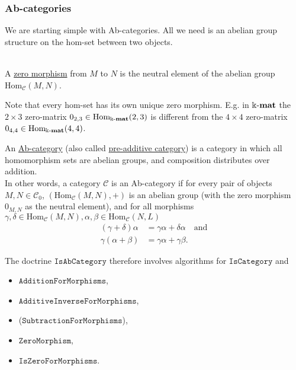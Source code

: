 \subsubsection{Ab-categories}
We are starting simple with Ab-categories. All we need is an abelian group structure on the hom-set between two objects.

\begin{definition}\label{def:zero_morphism}\phantom{}\\
A \ul{zero morphism} from $M$ to $N$ is the neutral element of the abelian group $\mathrm{Hom}_{\mathcal{C}}(M,N)$.
\end{definition}
Note that every hom-set has its own unique zero morphism. E.g. in $\Bbbk\textnormal{-}\mathbf{mat}$ the $2 \times 3$ zero-matrix
$0_{2,3} \in \textup{Hom}_{\Bbbk\textnormal{-}\mathbf{mat}}(2,3)$ is different from the $4 \times 4$ zero-matrix $0_{4,4} \in \textup{Hom}_{\Bbbk\textnormal{-}\mathbf{mat}}(4,4)$.

\begin{definition}[Ab-category]
An \ul{Ab-category} (also called \ul{pre-additive category}) is a category in which all homomorphism sets are abelian groups,
and composition distributes over addition.\\
In other words, a category $\mathcal{C}$ is an Ab-category if for every pair of objects $M,N \in \mathcal{C}_{0}$,
$( \mathrm{Hom}_{\mathcal{C}}(M,N), + )$ is an abelian group (with the zero morphism $0_{M,N}$ as the neutral element),
and for all morphisms $\gamma, \delta \in \mathrm{Hom}_{\mathcal{C}}(M,N),
\alpha, \beta \in \mathrm{Hom}_{\mathcal{C}}(N,L)$
\begin{align}
(\gamma + \delta)\alpha &=\label{eq:dist1} \gamma\alpha + \delta\alpha\quad \mathrm{ and }\\
\gamma(\alpha+\beta) &=\label{eq:dist2} \gamma\alpha + \gamma\beta.
\end{align}
\end{definition}

\begin{doctrine}[Ab-category]\label{doc:ab-category}
The doctrine $\mathtt{IsAbCategory}$ therefore involves algorithms for $\mathtt{IsCategory}$ and
\begin{itemize}
\item $\mathtt{AdditionForMorphisms}$,
\item $\mathtt{AdditiveInverseForMorphisms}$,
\item ($\mathtt{SubtractionForMorphisms}$),
\item $\mathtt{ZeroMorphism}$,
\item $\mathtt{IsZeroForMorphisms}$.
\end{itemize}
\end{doctrine}


